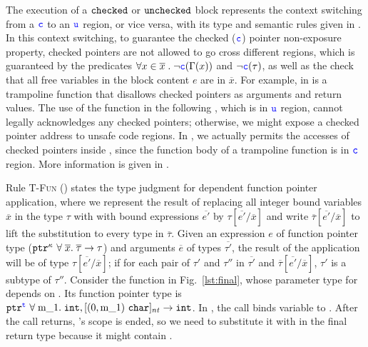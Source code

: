 The execution of a $\mathtt{checked}$ or $\mathtt{unchecked}$ block represents 
the context switching from a $\textcolor{blue}{\texttt{c}}$ to an $\textcolor{blue}{\texttt{u}}$ region, or vice versa,
with its type and semantic rules given in .
In this context switching, to guarantee the checked ($\textcolor{blue}{\texttt{c}}$) pointer non-exposure property, 
checked pointers are not allowed to go cross different regions, which is guaranteed by the predicates 
$\forall x\in\overline{x}\;.\;\neg\textcolor{blue}{\texttt{c}}(\Gamma(x))$ and $\neg\textcolor{blue}{\texttt{c}}(\tau)$,
as well as the check that all free variables in the block content $e$ are in $\overline{x}$.
For example,  in  is a trampoline function that disallows
checked pointers as arguments and return values.
The use of the function in the following , which is in $\textcolor{blue}{\texttt{u}}$ region,
cannot legally acknowledges any checked pointers; otherwise, we might expose a checked pointer address to unsafe code regions.
In \systemname, we actually permits the accesses of checked pointers inside ,
since the function body of a trampoline function is in $\textcolor{blue}{\texttt{c}}$ region.
More information is given in .

Rule \textsc{T-Fun} () states the type judgment for
dependent function pointer application, where we represent the result of
replacing all integer bound variables $\overline{x}$ in the type \(\tau\) with
with bound expressions $\overline{e'}$ by $\tau[\overline{e'} / \overline{x}]$
and write $\overline{\tau}[\overline{e'} / \overline{x}]$ to lift the
substitution to every type in \(\overline{\tau}\).
% 
Given an expression $e$ of function pointer type
($\mathtt{ptr}^{\kappa}~{\forall \;\overline{x}.\;{\overline{\tau}}\to\tau}$) and arguments
$\overline{e}$ of types $\overline{\tau'}$,
% 
the result of the application will
be of type $\tau[\overline{e'} / \overline{x}]$;
if for each pair of \(\tau'\) and \(\tau''\) in \(\overline{\tau'}\) and
$\overline{\tau}[\overline{e'} / \overline{x}]$, \(\tau'\) is a subtype of
\(\tau''\).
Consider the  function in
Fig.~\ref{lst:final}, whose parameter type for  
depends on .
Its function pointer type is 
$\tptr{\tfun{\code{m_1}}{\tint,\tntarray{0}{\code{m_1}}{\texttt{char}}}{\tint}}{\tmode}$.
In , the call  binds variable  to .
After the call returns, 's scope is ended, so we need to substitute it with  in the final return type
because it might contain .

